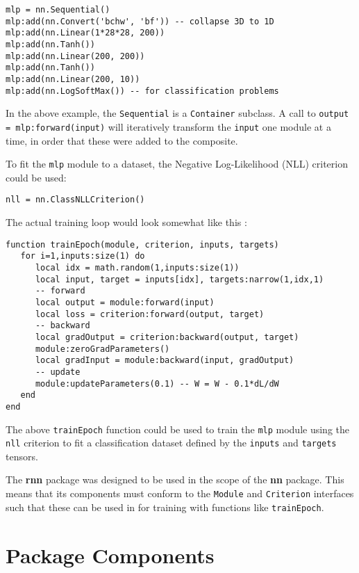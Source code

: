 \documentclass{article} %
\providecommand{\inlinecode}[1]{\texttt{#1}}
\begin{document}
\begin{verbatim}
mlp = nn.Sequential()
mlp:add(nn.Convert('bchw', 'bf')) -- collapse 3D to 1D
mlp:add(nn.Linear(1*28*28, 200))
mlp:add(nn.Tanh())
mlp:add(nn.Linear(200, 200))
mlp:add(nn.Tanh()) 
mlp:add(nn.Linear(200, 10))
mlp:add(nn.LogSoftMax()) -- for classification problems
\end{verbatim}

In the above example, the \inlinecode{Sequential} is a \inlinecode{Container} subclass.
A call to \inlinecode{output = mlp:forward(input)} will iteratively transform the \inlinecode{input}
one module at a time, in order that these were added to the composite.

To fit the \inlinecode{mlp} module to a dataset, the Negative Log-Likelihood (NLL) criterion could be used:

\begin{verbatim}
nll = nn.ClassNLLCriterion()
\end{verbatim}

The actual training loop would look somewhat like this :
\begin{verbatim}
function trainEpoch(module, criterion, inputs, targets)
   for i=1,inputs:size(1) do
      local idx = math.random(1,inputs:size(1))
      local input, target = inputs[idx], targets:narrow(1,idx,1)
      -- forward
      local output = module:forward(input)
      local loss = criterion:forward(output, target)
      -- backward
      local gradOutput = criterion:backward(output, target)
      module:zeroGradParameters()
      local gradInput = module:backward(input, gradOutput)
      -- update
      module:updateParameters(0.1) -- W = W - 0.1*dL/dW
   end
end
\end{verbatim}

The above \inlinecode{trainEpoch} function could be used to train the
\inlinecode{mlp} module using the \inlinecode{nll} criterion
to fit a classification dataset defined by the \inlinecode{inputs} and 
\inlinecode{targets} tensors. 

The \textbf{rnn} package was designed to be used in the scope of the \textbf{nn} package.
This means that its components must conform to the \inlinecode{Module} and 
\inlinecode{Criterion} interfaces such that these can be used in 
for training with functions like \inlinecode{trainEpoch}.

\section{Package Components}
\end{document}

